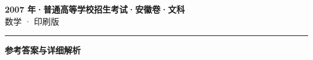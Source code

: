 \documentclass[zihao=5, a4paper]{ctexart}
\begin{document}
\begin{center}
  {\Large\bfseries 2007 年·普通高等学校招生考试·安徽卷·文科}\\[4pt]
  {\large 数学 · 印刷版}
\end{center}
\medskip
{}

\par\bigskip\hrule\bigskip
{}
\begin{center}{\large\bfseries 参考答案与详细解析}\end{center}
\smallskip

\end{document}
